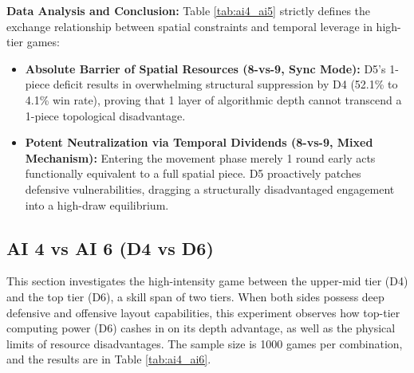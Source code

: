 \textbf{Data Analysis and Conclusion:} 
Table \ref{tab:ai4_ai5} strictly defines the exchange relationship between spatial constraints and temporal leverage in high-tier games:
\begin{itemize}
    \item \textbf{Absolute Barrier of Spatial Resources (8-vs-9, Sync Mode):} D5's 1-piece deficit results in overwhelming structural suppression by D4 (52.1\% to 4.1\% win rate), proving that 1 layer of algorithmic depth cannot transcend a 1-piece topological disadvantage.
    \item \textbf{Potent Neutralization via Temporal Dividends (8-vs-9, Mixed Mechanism):} Entering the movement phase merely 1 round early acts functionally equivalent to a full spatial piece. D5 proactively patches defensive vulnerabilities, dragging a structurally disadvantaged engagement into a high-draw equilibrium.
\end{itemize}

\subsection{AI 4 vs AI 6 (D4 vs D6)}
\label{subsec:ai4_ai6}

This section investigates the high-intensity game between the upper-mid tier (D4) and the top tier (D6), a skill span of two tiers. When both sides possess deep defensive and offensive layout capabilities, this experiment observes how top-tier computing power (D6) cashes in on its depth advantage, as well as the physical limits of resource disadvantages. The sample size is 1000 games per combination, and the results are in Table \ref{tab:ai4_ai6}.

\begin{table}[htbp]
    \centering
    \caption{AI 4 vs AI 6 Simulation Data Distribution (Sample Size=1000)}
    \label{tab:ai4_ai6}
\end{table}

